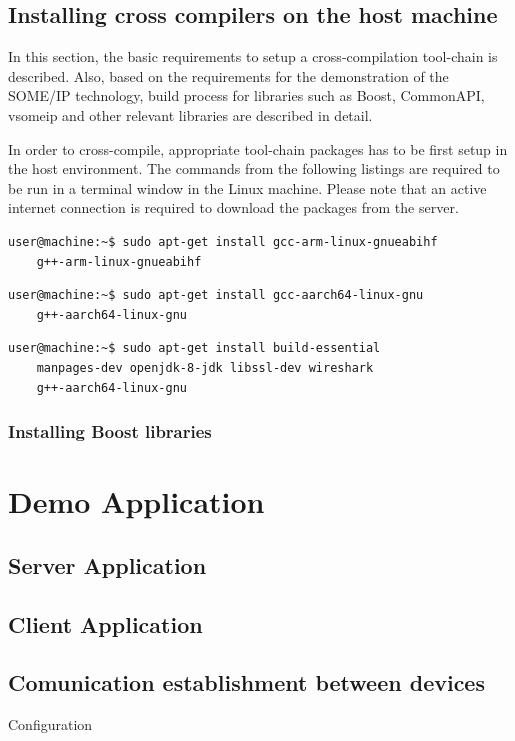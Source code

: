 \subsection{Installing cross compilers on the host machine}
In this section, the basic requirements to setup a cross-compilation tool-chain is described. Also, based on the requirements for the demonstration of the SOME/IP technology, build process for libraries such as Boost, CommonAPI, vsomeip and other relevant libraries are described in detail. 
\par In order to cross-compile, appropriate tool-chain packages has to be first setup in the host environment. The commands from the following listings are required to be run in a terminal window in the Linux machine. Please note that an active internet connection is required to download the packages from the server. 

\begin{lstlisting}[language=bash, caption={Command to install packages for ARM 32-bit (armv7) tool-chain}]
  user@machine:~$ sudo apt-get install gcc-arm-linux-gnueabihf
	g++-arm-linux-gnueabihf
\end{lstlisting}

\begin{lstlisting}[language=bash, caption={Command to install packages for ARM 64-bit(armv8) tool-chain}]
  user@machine:~$ sudo apt-get install gcc-aarch64-linux-gnu
	g++-aarch64-linux-gnu
\end{lstlisting}

\begin{lstlisting}[language=bash, caption={Command to install other required packages}]
  user@machine:~$ sudo apt-get install build-essential
	manpages-dev openjdk-8-jdk libssl-dev wireshark 
	g++-aarch64-linux-gnu
\end{lstlisting} 

\subsubsection{Installing Boost libraries}


\section{Demo Application}
\subsection{Server Application}
\subsection{Client Application}
\subsection{Comunication establishment between devices}
Configuration
